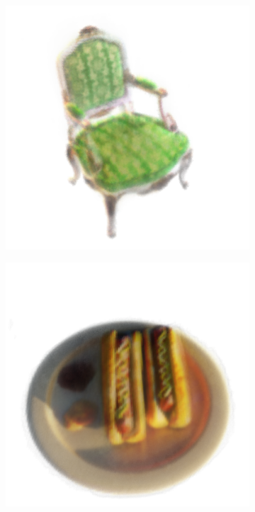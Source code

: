 \documentclass{article}
\begin{document}
\begin{figure}[!h]
\begin{subfigure}{.24\textwidth}
\end{subfigure}
\begin{subfigure}{.24\textwidth}
  \centering
  \includegraphics[width=\linewidth]{figs/results/chair.png}  
\end{subfigure}
\begin{subfigure}{.24\textwidth}
  \centering
  \includegraphics[width=\linewidth]{figs/results/hotdog.png}  
\end{subfigure}



\end{figure}
\end{document}
